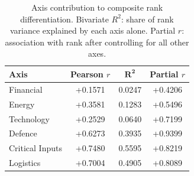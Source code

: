 \begin{table}[htbp]
\centering
\caption{Axis contribution to composite rank differentiation.  Bivariate $R^2$:
share of rank variance explained by each axis alone.  Partial $r$: association with
rank after controlling for all other axes.}
\label{tab:axis-rank-contrib}
\begin{tabular}{@{}l S[table-format=+1.4] S[table-format=1.4] S[table-format=+1.4]@{}}
\toprule
{\textbf{Axis}} & {\textbf{Pearson $r$}} & {$\boldsymbol{R^2}$} & {\textbf{Partial $r$}} \\
\midrule
  Financial & +0.1571 & 0.0247 & +0.4206 \\
  Energy & +0.3581 & 0.1283 & +0.5496 \\
  Technology & +0.2529 & 0.0640 & +0.7199 \\
  Defence & +0.6273 & 0.3935 & +0.9399 \\
  Critical Inputs & +0.7480 & 0.5595 & +0.8219 \\
  Logistics & +0.7004 & 0.4905 & +0.8089 \\
\bottomrule
\end{tabular}
\end{table}
